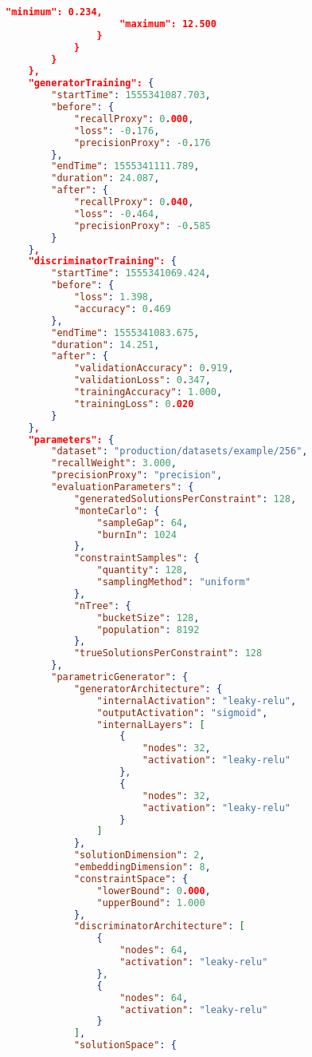 \documentclass[../main.tex]{subfiles}
\begin{document}
\begin{lstlisting}[language=json,firstnumber=1,caption={The output of a typical experiment, automatically logged when the experiment concludes.},captionpos=b]
                    "minimum": 0.234,
                    "maximum": 12.500
                }
            }
        }
    },
    "generatorTraining": {  
        "startTime": 1555341087.703,
        "before": {  
            "recallProxy": 0.000,
            "loss": -0.176,
            "precisionProxy": -0.176
        },
        "endTime": 1555341111.789,
        "duration": 24.087,
        "after": {  
            "recallProxy": 0.040,
            "loss": -0.464,
            "precisionProxy": -0.585
        }
    },
    "discriminatorTraining": {  
        "startTime": 1555341069.424,
        "before": {  
            "loss": 1.398,
            "accuracy": 0.469
        },
        "endTime": 1555341083.675,
        "duration": 14.251,
        "after": {  
            "validationAccuracy": 0.919,
            "validationLoss": 0.347,
            "trainingAccuracy": 1.000,
            "trainingLoss": 0.020
        }
    },
    "parameters": {  
        "dataset": "production/datasets/example/256",
        "recallWeight": 3.000,
        "precisionProxy": "precision",
        "evaluationParameters": {  
            "generatedSolutionsPerConstraint": 128,
            "monteCarlo": {  
                "sampleGap": 64,
                "burnIn": 1024
            },
            "constraintSamples": {  
                "quantity": 128,
                "samplingMethod": "uniform"
            },
            "nTree": {  
                "bucketSize": 128,
                "population": 8192
            },
            "trueSolutionsPerConstraint": 128
        },
        "parametricGenerator": {  
            "generatorArchitecture": {  
                "internalActivation": "leaky-relu",
                "outputActivation": "sigmoid",
                "internalLayers": [  
                    {  
                        "nodes": 32,
                        "activation": "leaky-relu"
                    },
                    {  
                        "nodes": 32,
                        "activation": "leaky-relu"
                    }
                ]
            },
            "solutionDimension": 2,
            "embeddingDimension": 8,
            "constraintSpace": {  
                "lowerBound": 0.000,
                "upperBound": 1.000
            },
            "discriminatorArchitecture": [  
                {  
                    "nodes": 64,
                    "activation": "leaky-relu"
                },
                {  
                    "nodes": 64,
                    "activation": "leaky-relu"
                }
            ],
            "solutionSpace": {  

\end{lstlisting}
\end{document}

